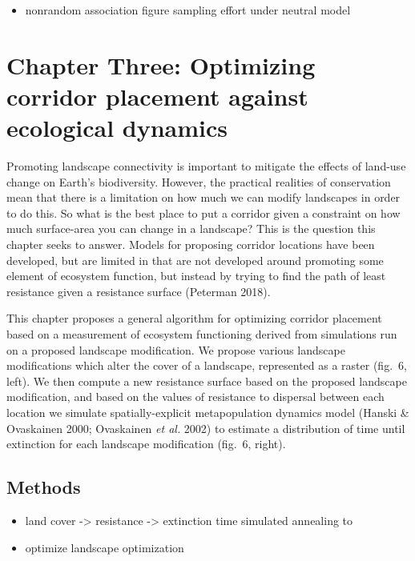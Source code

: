\documentclass[11pt]{article}
\begin{document}
\begin{itemize}
\tightlist
\item
  nonrandom association figure sampling effort under neutral model
\end{itemize}

\hypertarget{chapter-three-optimizing-corridor-placement-against-ecological-dynamics}{%
\section{Chapter Three: Optimizing corridor placement against ecological
dynamics}\label{chapter-three-optimizing-corridor-placement-against-ecological-dynamics}}

Promoting landscape connectivity is important to mitigate the effects of
land-use change on Earth's biodiversity. However, the practical
realities of conservation mean that there is a limitation on how much we
can modify landscapes in order to do this. So what is the best place to
put a corridor given a constraint on how much surface-area you can
change in a landscape? This is the question this chapter seeks to
answer. Models for proposing corridor locations have been developed, but
are limited in that are not developed around promoting some element of
ecosystem function, but instead by trying to find the path of least
resistance given a resistance surface (Peterman 2018).

This chapter proposes a general algorithm for optimizing corridor
placement based on a measurement of ecosystem functioning derived from
simulations run on a proposed landscape modification. We propose various
landscape modifications which alter the cover of a landscape,
represented as a raster (fig.~6, left). We then compute a new resistance
surface based on the proposed landscape modification, and based on the
values of resistance to dispersal between each location we simulate
spatially-explicit metapopulation dynamics model (Hanski \& Ovaskainen
2000; Ovaskainen \emph{et al.} 2002) to estimate a distribution of time
until extinction for each landscape modification (fig.~6, right).

\hypertarget{methods-1}{%
\subsection{Methods}\label{methods-1}}

\begin{itemize}
\tightlist
\item
  land cover -\textgreater{} resistance -\textgreater{} extinction time
  simulated annealing to
\item
  optimize landscape optimization
\end{itemize}
\end{document}
